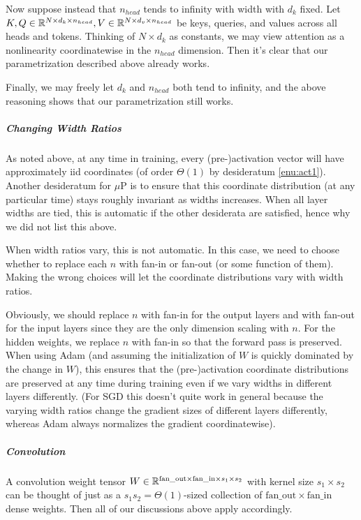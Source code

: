 \documentclass{article}
\theoremstyle{definition}
\newcommand{\fanin}{\mathrm{fan\_in}}
\newcommand{\fanout}{\mathrm{fan\_out}}
\begin{document}
    Now suppose instead that $n_{head}$ tends to infinity with width with $d_{k}$ fixed. Let $K,Q\in\mathbb{R}^{N\times d_{k}\times n_{head}},V\in\mathbb{R}^{N\times d_{v}\times n_{head}}$ be keys, queries, and values across all heads and tokens. Thinking of $N\times d_{k}$ as constants, we may view attention as a nonlinearity coordinatewise in the $n_{head}$ dimension. Then it's clear that our parametrization described above already works.
    
    Finally, we may freely let $d_{k}$ and $n_{head}$ both tend to infinity, and the above reasoning shows that our parametrization still works.
    
    \subparagraph*{Changing Width Ratios}
    
    As noted above, at any time in training, every (pre-)activation vector will have approximately iid coordinates (of order $\Theta(1)$ by desideratum \ref{enu:act1}). Another desideratum for $\mu$P is to ensure that this coordinate distribution (at any particular time) stays roughly invariant as widths increases. When all layer widths are tied, this is automatic if the other desiderata are satisfied, hence why we did not list this above.
    
    When width ratios vary, this is not automatic. In this case, we need to choose whether to replace each $n$ with fan-in or fan-out (or some function of them). Making the wrong choices will let the coordinate distributions vary with width ratios.
    
    Obviously, we should replace $n$ with fan-in for the output layers and with fan-out for the input layers since they are the only dimension scaling with $n$. 
    For the hidden weights, we replace $n$ with fan-in so that the forward pass is preserved. When using Adam (and assuming the initialization of $W$ is quickly dominated by the change in $W$), this ensures that the (pre-)activation coordinate distributions are preserved at any time during training even if we vary widths in different layers differently. (For SGD this doesn't quite work in general because the varying width ratios change the gradient sizes of different layers differently, whereas Adam always normalizes the gradient coordinatewise).
    
    \subparagraph*{Convolution}
    
    A convolution weight tensor $W\in\R^{\fanout\times\fanin\times s_{1}\times s_{2}}$ with kernel size $s_{1}\times s_{2}$ can be thought of just as a $s_{1}s_{2}=\Theta(1)$-sized collection of $\fanout\times\fanin$ dense weights. Then all of our discussions above apply accordingly.
    
\end{document}
